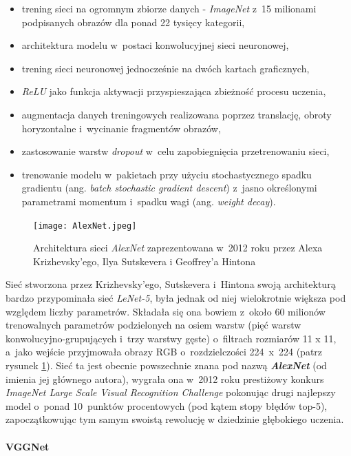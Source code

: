 \begin{itemize}
\item trening sieci na ogromnym zbiorze danych - \emph{ImageNet} z~15 milionami podpisanych obrazów dla ponad 22 tysięcy kategorii,
\item architektura modelu w~postaci konwolucyjnej sieci neuronowej, 
\item trening sieci neuronowej jednocześnie na dwóch kartach graficznych,
\item \emph{ReLU} jako funkcja aktywacji przyspieszająca zbieżność procesu uczenia, 
\item augmentacja danych treningowych realizowana poprzez translację, obroty horyzontalne i~wycinanie fragmentów obrazów, 
\item zastosowanie warstw \emph{dropout} w~celu zapobiegnięcia przetrenowaniu sieci,
\item trenowanie modelu w~pakietach przy użyciu stochastycznego spadku gradientu (ang. \emph{batch stochastic gradient descent}) z~jasno określonymi parametrami momentum i~spadku wagi (ang. \emph{weight decay}).
\end{itemize}

\begin{figure}[!h]
    \centering \texttt{[image: AlexNet.jpeg]}\
    \captionsetup{format=hang}
    \caption{Architektura sieci \emph{AlexNet} zaprezentowana w~2012 roku przez Alexa Krizhevsky'ego, Ilya Sutskevera i Geoffrey'a Hintona \cite{alexnet}}
    \label{fig:alexnet1}
\end{figure}

Sieć stworzona przez Krizhevsky'ego, Sutskevera i~Hintona  swoją architekturą bardzo przypominała sieć \emph{LeNet-5}, była jednak od niej wielokrotnie większa pod względem liczby parametrów. Składała się ona bowiem z~około 60 milionów trenowalnych parametrów podzielonych na osiem warstw (pięć warstw konwolucyjno-grupujących i~trzy warstwy gęste) o~filtrach rozmiarów 11 x 11, a~jako wejście przyjmowała obrazy RGB o~rozdzielczości 224~x~224 (patrz rysunek \ref{fig:alexnet1}). Sieć ta jest obecnie powszechnie znana pod nazwą \textbf{\emph{AlexNet}} (od imienia jej głównego autora), wygrała ona w~2012 roku prestiżowy konkurs \emph{ImageNet Large Scale Visual Recognition Challenge} pokonując drugi najlepszy model o~ponad 10~punktów procentowych (pod kątem stopy błędów top-5), zapoczątkowując tym samym swoistą rewolucję w dziedzinie głębokiego uczenia.

\paragraph*{VGGNet}

